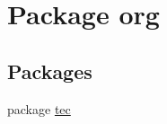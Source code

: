 \hypertarget{namespaceorg}{}\section{Package org}
\label{namespaceorg}
\subsection*{Packages}
\begin{DoxyCompactItemize}
\item 
package \mbox{\hyperlink{namespaceorg_1_1tec}{tec}}
\end{DoxyCompactItemize}

